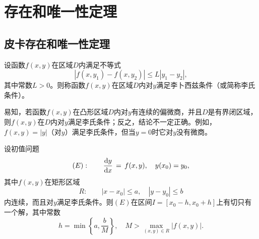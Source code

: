 \section{存在和唯一性定理}
\subsection{皮卡存在和唯一性定理}
\begin{defn}\label{def:Libsitz:like:}
设函数$f(x,y)$在区域$D$内满足不等式
$$\left|f(x,y_1)-f(x,y_2)\right|\leq L\left|y_1-y_2\right|,$$
其中常数$L>0$。则称函数$f(x,y)$在区域$D$内对$y$满足{\heiti 李卜西兹条件}（或简称{\heiti 李氏条件}）。
\end{defn}\par
易知，若函数$f(x,y)$在凸形区域$D$内对$y$有连续的偏微商，并且$D$是有界闭区域，则$f(x,y)$在$D$内对$y$满足李氏条件；反之，结论不一定正确。例如，$f(x,y)=\left|y\right|$（对$y$）满足李氏条件，但当$y=0$时它对$y$没有微商。

\begin{theo}\label{theo:picard_theorem}
设初值问题
$$(E):\quad\quad \frac{\mathrm{d}{}y}{\mathrm{d}{}x}\,=\,f(x,y),\quad y(x_0)=y_0,$$
其中$f(x,y)$在矩形区域
$$R:\quad\quad |x-x_0|\leq a,\quad |y-y_0|\leq b$$
内连续，而且对$y$满足李氏条件。则$(E)$在区间$I=[x_0-h,x_0+h]$上有切只有一个解，其中常数
$$h=\min\left\{a,\frac{b}{M}\right\},\quad M>\max_{(x,y)\in R}|f(x,y)|.$$
\end{theo}
